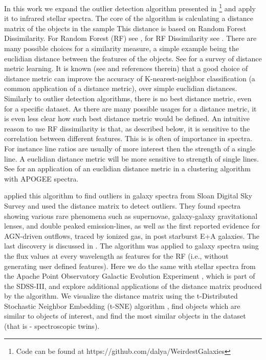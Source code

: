 \documentclass[fleqn,usenatbib]{mnras}
\begin{document}

In this work we expand the outlier detection algorithm presented in \cite{baron17a} \footnote{Code can be found at https://github.com/dalya/WeirdestGalaxies} and apply it to infrared stellar spectra. The core of the algorithm is calculating a distance matrix of the objects in the sample This distance is based on Random Forest Dissimilarity. For Random Forest (RF) see \citet{breiman84,breiman01}, for RF Dissimilarity see \citet{breiman03,shi06}. There are many possible choices for a similarity measure, a simple example being the euclidian distance between the features of the objects. See \citet{yang06} for a survey of distance metric learning. It is known (see \citet{yang06}  and references therein) that a good choice of distance metric can improve the accuracy of K-nearest-neighbor classification (a common application of a distance metric), over simple euclidian distances.  Similarly to outlier detection algorithms, there is no best distance metric, even for a specific dataset. As there are many possible usages for a distance metric, it is even less clear how such best distance metric would be defined. An intuitive reason to use RF dissimilarity is that, as described below, it is sensitive to the correlation between different features. This is is often of importance in spectra. For instance line ratios are usually of more interest then the strength of a single line. A euclidian distance metric will be more sensitive to strength of single lines. See   \citet{garcia-dias18} for an application of an euclidian distance metric in a clustering algorithm with APOGEE spectra.


\cite{baron17a} applied this algorithm to find outliers in galaxy spectra from Sloan Digital Sky Survey \citep[SDSS; ][]{eisenstein11} and used the distance matrix to detect outliers. They found spectra showing various rare phenomena such as supernovae, galaxy-galaxy gravitational lenses, and double peaked emission-lines, as well as the first reported evidence for AGN-driven outflows, traced by ionized gas, in post starburst E+A galaxies. The last discovery is discussed in \citet{baron17}. The algorithm was applied to galaxy spectra using the flux values at every wavelength as features for the RF (i.e., without generating user defined features). Here we do the same with stellar spectra from the Apache Point Observatory Galactic Evolution Experiment \citep[APOGEE, ][]{majewski16}, which is part of the SDSS-III, and explore additional applications of the distance matrix produced by the algorithm. We visualize the distance matrix using the t-Distributed Stochastic Neighbor Embedding (t-SNE) algorithm \citep{maaten08}, find objects which are similar to objects of interest, and find the most similar objects in the dataset (that is - spectroscopic twins).
\end{document}
